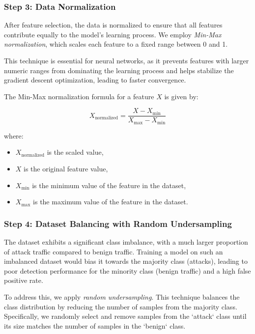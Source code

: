 \documentclass[16pt]{report}
\begin{document}
\subsubsection{Step 3: Data Normalization}


After feature selection, the data is normalized to ensure that all features contribute equally to the model’s learning process. We employ \textit{Min-Max normalization}, which scales each feature to a fixed range between 0 and 1.

This technique is essential for neural networks, as it prevents features with larger numeric ranges from dominating the learning process and helps stabilize the gradient descent optimization, leading to faster convergence.

The Min-Max normalization formula for a feature \( X \) is given by:

\[
X_{\text{normalized}} = \frac{X - X_{\min}}{X_{\max} - X_{\min}}
\]

where:

\begin{itemize}
    \item \( X_{\text{normalized}} \) is the scaled value,
    \item \( X \) is the original feature value,
    \item \( X_{\min} \) is the minimum value of the feature in the dataset,
    \item \( X_{\max} \) is the maximum value of the feature in the dataset.
\end{itemize}

\subsubsection{Step 4: Dataset Balancing with Random Undersampling}

The dataset exhibits a significant class imbalance, with a much larger proportion of attack traffic compared to benign traffic. Training a model on such an imbalanced dataset would bias it towards the majority class (attacks), leading to poor detection performance for the minority class (benign traffic) and a high false positive rate.

To address this, we apply \textit{random undersampling}. This technique balances the class distribution by reducing the number of samples from the majority class. Specifically, we randomly select and remove samples from the `attack` class until its size matches the number of samples in the `benign` class.
\end{document}
